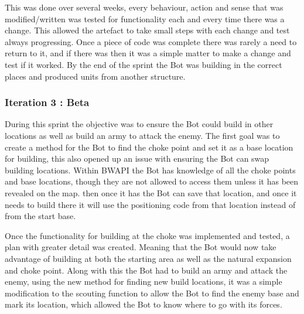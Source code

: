 \documentclass[journal]{IEEEtran}
\begin{document}
This was done over several weeks, every behaviour, action and sense that was modified/written was tested for functionality each and every time there was a change. This allowed the artefact to take small steps with each change and test always progressing. Once a piece of code was complete there was rarely a need to return to it, and if there was then it was a simple matter to make a change and test if it worked. By the end of the sprint the Bot was building in the correct places and produced units from another structure.
\newline

\subsubsection{Iteration 3 : Beta}
During this sprint the objective was to ensure the Bot could build in other locations as well as build an army to attack the enemy. The first goal was to create a method for the Bot to find the choke point and set it as a base location for building, this also opened up an issue with ensuring the Bot can swap building locations. Within BWAPI the Bot has knowledge of all the choke points and base locations, though they are not allowed to access them unless it has been revealed on the map. then once it has the Bot can save that location, and once it needs to build there it will use the positioning code from that location instead of from the start base. 

Once the functionality for building at the choke was implemented and tested, a plan with greater detail was created. Meaning that the Bot would now take advantage of building at both the starting area as well as the natural expansion and choke point. Along with this the Bot had to build an army and attack the enemy, using the new method for finding new build locations, it was a simple modification to the scouting function to allow the Bot to find the enemy base and mark its location, which allowed the Bot to know where to go with its forces.
\newline
\end{document}

